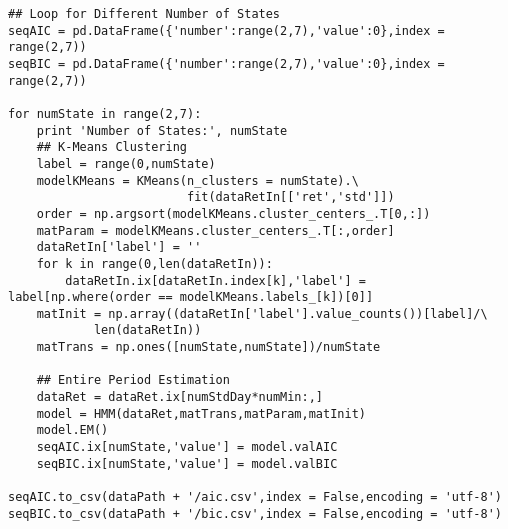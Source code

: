 \begin{spacing}{1.2}
\begin{lstlisting}
## Loop for Different Number of States
seqAIC = pd.DataFrame({'number':range(2,7),'value':0},index = range(2,7))
seqBIC = pd.DataFrame({'number':range(2,7),'value':0},index = range(2,7))

for numState in range(2,7):
    print 'Number of States:', numState
    ## K-Means Clustering
    label = range(0,numState)
    modelKMeans = KMeans(n_clusters = numState).\
                         fit(dataRetIn[['ret','std']])
    order = np.argsort(modelKMeans.cluster_centers_.T[0,:])
    matParam = modelKMeans.cluster_centers_.T[:,order]
    dataRetIn['label'] = ''
    for k in range(0,len(dataRetIn)):
        dataRetIn.ix[dataRetIn.index[k],'label'] = label[np.where(order == modelKMeans.labels_[k])[0]]
    matInit = np.array((dataRetIn['label'].value_counts())[label]/\
            len(dataRetIn))
    matTrans = np.ones([numState,numState])/numState
    
    ## Entire Period Estimation
    dataRet = dataRet.ix[numStdDay*numMin:,]
    model = HMM(dataRet,matTrans,matParam,matInit)
    model.EM()
    seqAIC.ix[numState,'value'] = model.valAIC
    seqBIC.ix[numState,'value'] = model.valBIC
    
seqAIC.to_csv(dataPath + '/aic.csv',index = False,encoding = 'utf-8')
seqBIC.to_csv(dataPath + '/bic.csv',index = False,encoding = 'utf-8')
\end{lstlisting}
\end{spacing}